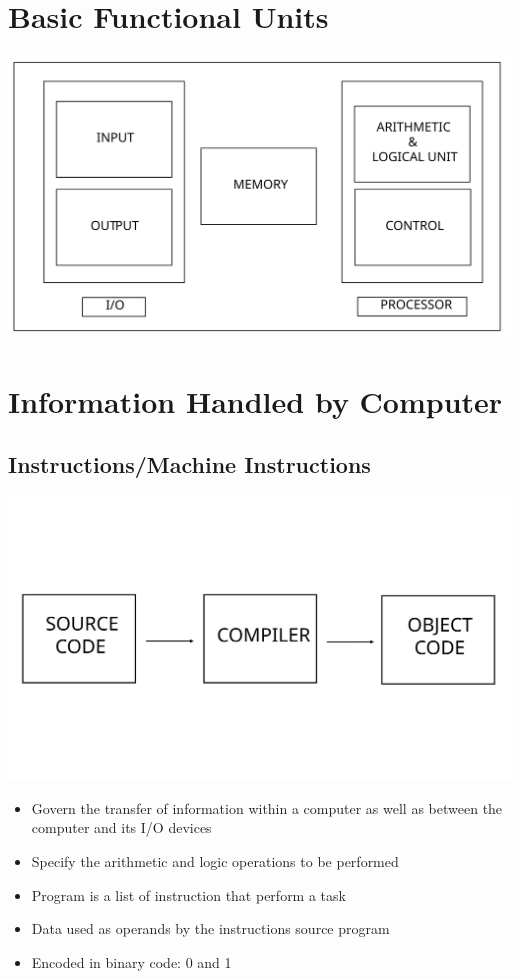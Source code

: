 \documentclass[british]{extreport}
\begin{document}
\section{Basic Functional Units}
\begin{center}
	\includegraphics[scale=0.3]{Picture/FUNCTIONAL_UNIT}
	\par\end{center}

\section{Information Handled by Computer}

\subsection{Instructions/Machine Instructions}
\begin{center}
	\includegraphics[scale=0.25]{Picture/COMPILER_DIAGRAM}
	\par\end{center}
\begin{itemize}
	\item Govern the transfer of information within a computer as well as between
	      the computer and its I/O devices
	\item Specify the arithmetic and logic operations to be performed
	\item Program is a list of instruction that perform a task
	\item Data used as operands by the instructions source program
	\item Encoded in binary code: 0 and 1
\end{itemize}
\vfill{}
\end{document}
